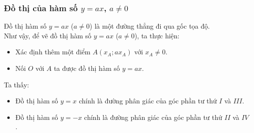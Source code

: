 \subsubsection{Đồ thị của hàm số \boldmath$ y = ax $, $ a \ne 0 $}
Đồ thị hàm số $ y = ax $ ($ a \ne 0 $) là một đường thẳng đi qua gốc tọa độ.\\
Như vậy, để vẽ đồ thị hàm số $ y = ax $ ($ a \ne 0 $), ta thực hiện:
\begin{itemize}
	\item Xác định thêm một điểm $ A\left(x_A;ax_A \right) $ với $ x_A \ne 0. $
	\item Nối $ O $ với $A $ ta được đồ thị hàm số $ y = ax. $
\end{itemize} 
\begin{nx}
Ta thấy:
\begin{itemize}
	\item Đồ thị hàm số $ y = x $ chính là đường phân giác của góc phần tư thứ $ I $ và $ III $.
	\item Đồ thị hàm số $ y = -x $ chính là đường phân giác của góc phần tư thứ $ II $ và $ IV $.
\end{itemize}
\end{nx}
